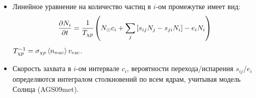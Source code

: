 \begin{itemize}
	\item Линейное уравнение на количество частиц в $i$-ом промежутке имеет вид:
	\begin{equation*}
		\frac{\partial N_{i}}{\partial t} = \cfrac{1}{T_{\chi p}} \left(N_{\odot} c_i +
		\sum_j{[s_{ij} N_{j} - s_{ji} N_{i} ]} - e_{i} N_i  \right)
	\end{equation*}
	$T_{\chi p}^{-1} = \sigma_{\chi p} \left\langle n_{nuc} \right\rangle v_{esc}$.
	\item Скорость захвата в $i$-ом интервале $c_i$, вероятности перехода/испарения $s_{ij}$/$e_{i}$ определяются интегралом столкновений по всем ядрам, учитывая модель Солнца (AGS09met).
\end{itemize}
